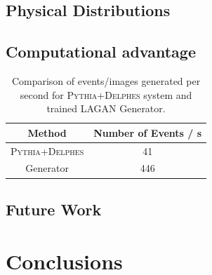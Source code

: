 \documentclass{report}
\newcommand{\pkg}[1]{\textsc{#1}}
\newcommand{\pythia}{\pkg{Pythia}}
\newcommand{\delphes}{\pkg{Delphes}}
\begin{document}
\section{Physical Distributions}

\section{Computational advantage}
\begin{table}[H]
	\centering
	\begin{tabular}{cc}
		\toprule Method  & Number of Events / \si{\second} \\
		\midrule \pythia+\delphes  & 41\\
		\midrule Generator  & 446\\
		
		\bottomrule
	\end{tabular}
	\caption{Comparison of events/images generated per second for \pkg{Pythia}+\pkg{Delphes} system and trained LAGAN Generator.}
\end{table}
	
\section{Future Work}

\chapter{Conclusions}
\label{sec:conclusions}
\printbibliography[title=References]

\begin{appendices}

\end{appendices}
\end{document}
